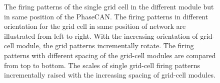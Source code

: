 \documentclass[final,5p,times,twocolumn,authoryear]{elsarticle}
\begin{document}
\begin{figure}[!t]
\vspace{-10pt}
\hspace{-10pt}
\hspace{-10pt}
	\caption{The firing patterns of the single grid cell in the different module but in same position of the PhaseCAN. The firing patterns in different orientation for the grid cell in same position of network are illustrated from left to right. With the increasing orientation of grid-cell module, the grid patterns incrementally rotate. The firing patterns with different spacing of the grid-cell modules are compared from top to bottom. The scales of single grid-cell firing patterns incrementally raised with the increasing spacing of grid-cell modules. }
	\label{fig:single_neuron_firing_diff_prop}
	\vspace{-2pt}
\end{figure}
\end{document}
